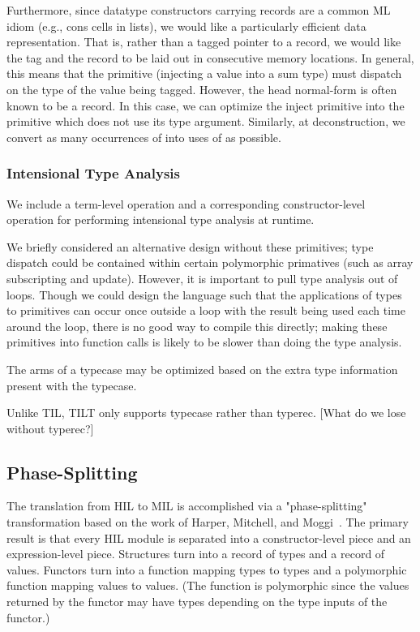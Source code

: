\documentclass[twoside]{article}
\begin{document}
Furthermore, since datatype constructors carrying records are a common
ML idiom (e.g., cons cells in lists), we would like a particularly
efficient data representation.  That is, rather than a tagged pointer
to a record, we would like the tag and the record to be laid out in
consecutive memory locations.  In general, this means that the
 primitive (injecting a value into a sum type) must
dispatch on the type of the value being tagged.
However, the head normal-form is often known to be a record.  In this
case, we can optimize the inject primitive into the 
primitive which does not use its type argument.
Similarly, at deconstruction, we convert as many occurrences of
 into uses of  as possible.

\subsubsection{Intensional Type Analysis}

We include a  term-level operation and a corresponding
 constructor-level operation for performing intensional
type analysis at runtime.~\cite{harper-morrisett:intensional}

We briefly considered an alternative design without these primitives;
type dispatch could be contained within certain polymorphic primatives
(such as array subscripting and update).  However, it is important to
pull type analysis out of loops.  Though we could design the language
such that the applications of types to primitives can occur once
outside a loop with the result being used each time around the loop,
there is no good way to compile this directly; making these primitives
into function calls is likely to be slower than doing the type
analysis.

The arms of a typecase may be optimized based on the extra type
information present with the typecase.

Unlike TIL, TILT only supports typecase rather than typerec.
[What do we lose without typerec?]

\subsection{Phase-Splitting}

The translation from HIL to MIL is accomplished via a
"phase-splitting" transformation based on the work of Harper,
Mitchell, and Moggi~\cite{HMM}.  The primary result is that every HIL
module is separated into a constructor-level piece and an
expression-level piece.  Structures turn into a record of types and a
record of values.  Functors turn into a function mapping types to
types and a polymorphic function mapping values to values.  (The
function is polymorphic since the values returned by the functor may
have types depending on the type inputs of the functor.)
\end{document}
